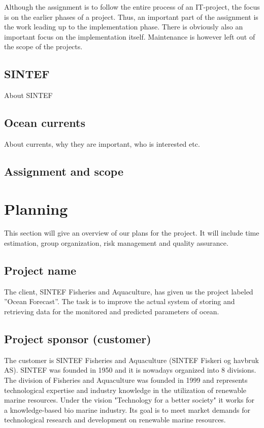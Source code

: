 \documentclass[11pt,a4paper,titlepage,oneside]{report}
\begin{document}
Although the assignment is to follow the entire process of an IT-project, the focus is on the earlier phases of a project. Thus, an important part of the assignment is the work leading up to the implementation phase. There is obviously also an important focus on the implementation itself. Maintenance is however left out of the scope of the projects.

\section{SINTEF}
About SINTEF

\section{Ocean currents}
About currents, why they are important, who is interested etc.

\section{Assignment and scope}

\chapter{Planning}
This section will give an overview of our plans for the project. It will include time estimation, group organization, risk management and quality assurance.
\section{Project name}
The client, SINTEF Fisheries and Aquaculture, has given us the project labeled ”Ocean Forecast”. The task is to improve the actual system of storing and retrieving data for the monitored and predicted parameters of ocean.
\section{Project sponsor (customer)}
The customer is SINTEF Fisheries and Aquaculture (SINTEF Fiskeri og havbruk AS). 
SINTEF was founded in 1950 and it is nowadays organized into 8 divisions. The division of Fisheries and Aquaculture was founded in 1999 and represents technological expertise and industry knowledge in the utilization of renewable marine resources. Under the vision "Technology for a better society" it works for a knowledge-based bio marine industry. Its goal is to meet market demands for technological research and development on renewable marine resources.
\end{document}
